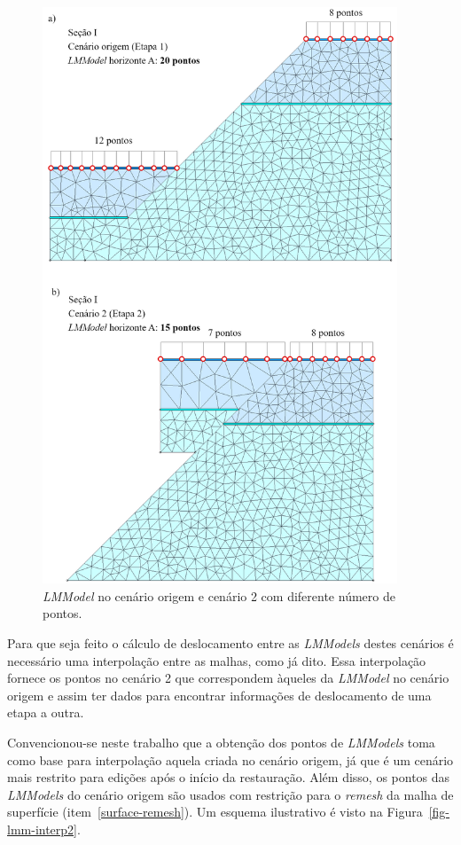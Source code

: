 \begin{figure} [H]
  \begin{center}
    \includegraphics[width=300pt]{images/fig-lmm-interp1}
    \caption{\textit{LMModel} no cenário origem e cenário 2 com diferente número de pontos.}\label{fig-lmm-interp1}
  \end{center}
\end{figure}

Para que seja feito o cálculo de deslocamento entre as \textit{LMModels} destes cenários é necessário uma interpolação entre as malhas, como já dito. Essa interpolação fornece os pontos no cenário 2 que correspondem àqueles da \textit{LMModel} no cenário origem e assim ter dados para encontrar informações de deslocamento de uma etapa a outra.

Convencionou-se neste trabalho que a obtenção dos pontos de \textit{LMModels} toma como base para interpolação aquela criada no cenário origem, já que é um cenário mais restrito para edições após o início da restauração. Além disso, os pontos das \emph{LMModels} do cenário origem são usados com restrição para o \emph{remesh} da malha de superfície (item~\ref{surface-remesh}). Um esquema ilustrativo é visto na Figura~\ref{fig-lmm-interp2}.

